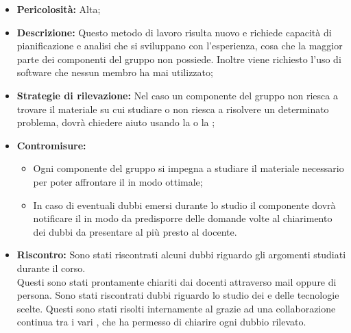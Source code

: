 \label{r_inesp}
\begin{itemize}
\item \textbf{Pericolosità:} Alta;
\item \textbf{Descrizione:} Questo metodo di lavoro risulta nuovo e richiede capacità di pianificazione e analisi che si sviluppano con l'esperienza, cosa che la maggior parte dei componenti del gruppo non possiede. Inoltre viene richiesto l'uso di software che nessun membro ha mai utilizzato;
\item \textbf{Strategie di rilevazione:} Nel caso un componente del gruppo non riesca a trovare il materiale su cui studiare o non riesca a risolvere un determinato problema, dovrà chiedere aiuto usando la  o la ;
\item \textbf{Contromisure:}
\begin{itemize}
\item Ogni componente del gruppo si impegna a studiare il materiale necessario per poter affrontare il  in modo ottimale;
\item In caso di eventuali dubbi emersi durante lo studio il componente dovrà notificare il \rRP in modo da predisporre delle domande volte al chiarimento dei dubbi da presentare al più presto al docente.
\end{itemize}
\item \textbf{Riscontro:}
Sono stati riscontrati alcuni dubbi riguardo gli argomenti studiati durante il corso. \\
Questi sono stati prontamente chiariti dai docenti attraverso mail oppure di persona. Sono stati riscontrati dubbi riguardo lo studio dei  e delle tecnologie scelte. Questi sono stati risolti internamente al  grazie ad una collaborazione continua tra i vari \rPs, che ha permesso di chiarire ogni dubbio rilevato.
\end{itemize}
